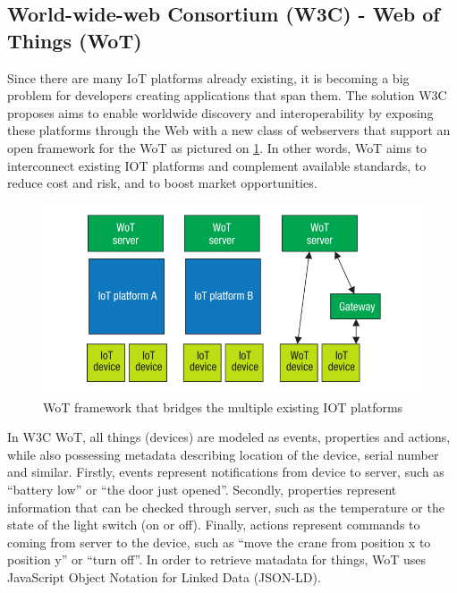 \subsection{World-wide-web Consortium (W3C) - Web of Things (WoT)}

Since there are many IoT platforms already existing, it is becoming a big problem for developers creating applications that span them. The solution W3C proposes aims to enable worldwide discovery and interoperability by exposing these platforms through the Web with a new class of webservers that support an open framework for the WoT as pictured on \ref{fig:WOTWebservers}. In other words, WoT aims to interconnect existing IOT platforms and complement available standards, to reduce cost and risk, and to boost market opportunities.

\begin{figure}[ht]
	\begin{center}
		\includegraphics[width=\textwidth]{images/WOTWebservers}
		\caption{WoT framework that bridges the multiple existing IOT platforms}
		\label{fig:WOTWebservers}
	\end{center}
\end{figure}

In W3C WoT, all things (devices) are modeled as events, properties and actions, while also possessing metadata describing location of the device, serial number and similar. Firstly, events represent notifications from device to server, such as ``battery low'' or ``the door just opened''. Secondly, properties represent information that can be checked through server, such as the temperature or the state of the light switch (on or off). Finally, actions represent commands to coming from server to the device, such as ``move the crane from position x to position y'' or ``turn off''. In order to retrieve matadata for things, WoT uses JavaScript Object Notation for Linked Data (JSON-LD).

